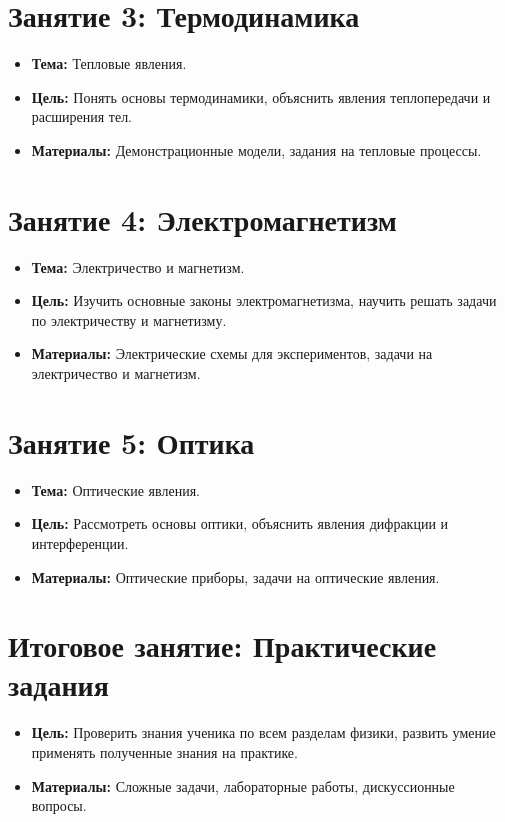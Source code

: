 \documentclass{article}
\begin{document}
\section{Занятие 3: Термодинамика}
\begin{itemize}
    \item \textbf{Тема:} Тепловые явления.
    \item \textbf{Цель:} Понять основы термодинамики, объяснить явления теплопередачи и расширения тел.
    \item \textbf{Материалы:} Демонстрационные модели, задания на тепловые процессы.
\end{itemize}

\section{Занятие 4: Электромагнетизм}
\begin{itemize}
    \item \textbf{Тема:} Электричество и магнетизм.
    \item \textbf{Цель:} Изучить основные законы электромагнетизма, научить решать задачи по электричеству и магнетизму.
    \item \textbf{Материалы:} Электрические схемы для экспериментов, задачи на электричество и магнетизм.
\end{itemize}

\section{Занятие 5: Оптика}
\begin{itemize}
    \item \textbf{Тема:} Оптические явления.
    \item \textbf{Цель:} Рассмотреть основы оптики, объяснить явления дифракции и интерференции.
    \item \textbf{Материалы:} Оптические приборы, задачи на оптические явления.
\end{itemize}

\section{Итоговое занятие: Практические задания}
\begin{itemize}
    \item \textbf{Цель:} Проверить знания ученика по всем разделам физики, развить умение применять полученные знания на практике.
    \item \textbf{Материалы:} Сложные задачи, лабораторные работы, дискуссионные вопросы.
\end{itemize}
\end{document}
